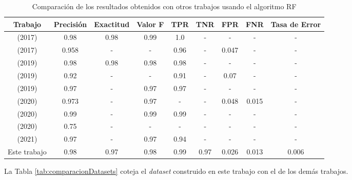 \begin{table}[htb!]
    \centering
    \scriptsize %
    \caption{Comparación de los resultados obtenidos con otros trabajos usando el algoritmo RF}
    \begin{tabular}{|c|c|c|c|c|c|c|c|c|}
        \hline
        \rowcolor[HTML]{C0C0C0} 
        \textbf{Trabajo} & \textbf{Precisión} & \textbf{Exactitud} & \textbf{Valor F} & \textbf{\gls{TPR}} & \textbf{\gls{TNR}} & \textbf{\gls{FPR}} & \textbf{\gls{FNR}} & \textbf{Tasa de Error}\\ \hline
        
        \cite{shallow} (2017) & 0.98 & 0.98 & 0.99 & 1.0 & - & - & - & -\\ \hline
        \cite{flow} (2017) & 0.958 & - & - & 0.96 & - & 0.047 & - & -\\ \hline
        \cite{detecting} (2019) & 0.98 & 0.98 & 0.98 & 0.98 & - & - & - & -\\ \hline
        \cite{Kok2019} (2019) & 0.92 & - & - & 0.91 & - & 0.07 & - & -\\ \hline
        \cite{entropy} (2019) & 0.97 & - & 0.97 & 0.97 & - & - & - & -\\ \hline
        \cite{two} (2020) & 0.973 & - & 0.97 & - & - & 0.048 & 0.015 & -\\ \hline
        \cite{Kok2020} (2020) & 0.99 & - & 0.99 & 0.99 & - & - & - & -\\ \hline
        \cite{ARABO2020289} (2020) & 0.75 & - & - & - & - & - & - & -\\ \hline
        \cite{Aurangzeb2021} (2021) & 0.97 & - & 0.97 & 0.94 & - & - & - & -\\ \hline
        Este trabajo & 0.98 & 0.97 & 0.98 & 0.99 & 0.97 & 0.026 & 0.013 & 0.006\\ \hline
        
    \end{tabular}
    \label{tab:comparacion}
\end{table}

\newpage



La Tabla \ref{tab:comparacionDatasets} coteja el \textit{dataset} construido en este trabajo con el de los demás trabajos. 

